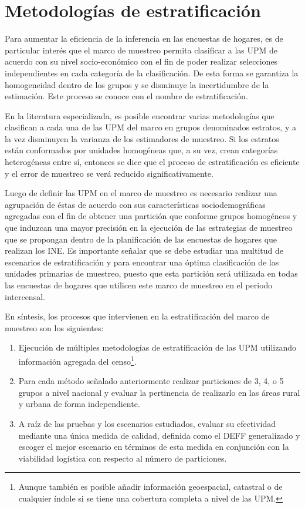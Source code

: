 \documentclass[
  12pt,
]{book}
\providecommand{\tightlist}{%
  \setlength{\itemsep}{0pt}\setlength{\parskip}{0pt}}
\begin{document}
\hypertarget{metodologuxedas-de-estratificaciuxf3n}{%
\chapter{Metodologías de estratificación}\label{metodologuxedas-de-estratificaciuxf3n}}

Para aumentar la eficiencia de la inferencia en las encuestas de hogares, es de particular interés que el marco de muestreo permita clasificar a las UPM de acuerdo con su nivel socio-económico con el fin de poder realizar selecciones independientes en cada categoría de la clasificación. De esta forma se garantiza la homogeneidad dentro de los grupos y se disminuye la incertidumbre de la estimación. Este proceso se conoce con el nombre de estratificación.

En la literatura especializada, es posible encontrar varias metodologías que clasifican a cada una de las UPM del marco en grupos denominados estratos, y a la vez disminuyen la varianza de los estimadores de muestreo. Si los estratos están conformados por unidades homogéneas que, a su vez, crean categorías heterogéneas entre sí, entonces se dice que el proceso de estratificación es eficiente y el error de muestreo se verá reducido significativamente.

Luego de definir las UPM en el marco de muestreo es necesario realizar una agrupación de éstas de acuerdo con sus características sociodemográficas agregadas con el fin de obtener una partición que conforme grupos homogéneos y que induzcan una mayor precisión en la ejecución de las estrategias de muestreo que se propongan dentro de la planificación de las encuestas de hogares que realizan los INE. Es importante señalar que se debe estudiar una multitud de escenarios de estratificación y para encontrar una óptima clasificación de las unidades primarias de muestreo, puesto que esta partición será utilizada en todas las encuestas de hogares que utilicen este marco de muestreo en el periodo intercensal.

En síntesis, los procesos que intervienen en la estratificación del marco de muestreo son los siguientes:

\begin{enumerate}
\def\labelenumi{\arabic{enumi}.}
\tightlist
\item
  Ejecución de múltiples metodologías de estratificación de las UPM utilizando información agregada del censo\footnote{Aunque también es posible añadir información geoespacial, catastral o de cualquier índole si se tiene una cobertura completa a nivel de las UPM.}.
\item
  Para cada método señalado anteriormente realizar particiones de 3, 4, o 5 grupos a nivel nacional y evaluar la pertinencia de realizarlo en las áreas rural y urbana de forma independiente.
\item
  A raíz de las pruebas y los escenarios estudiados, evaluar su efectividad mediante una única medida de calidad, definida como el DEFF generalizado y escoger el mejor escenario en términos de esta medida en conjunción con la viabilidad logística con respecto al número de particiones.
\end{enumerate}
\end{document}
